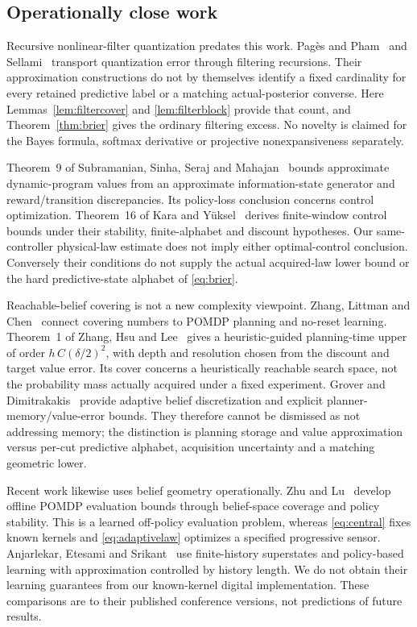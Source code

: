 \subsection{Operationally close work}
Recursive nonlinear-filter quantization predates this work. Pag\`es and Pham~\cite{pages} and Sellami~\cite{sellami} transport quantization error through filtering recursions. Their approximation constructions do not by themselves identify a fixed cardinality for every retained predictive label or a matching actual-posterior converse. Here Lemmas~\ref{lem:filtercover} and \ref{lem:filterblock} provide that count, and Theorem~\ref{thm:brier} gives the ordinary filtering excess. No novelty is claimed for the Bayes formula, softmax derivative or projective nonexpansiveness separately.

Theorem~9 of Subramanian, Sinha, Seraj and Mahajan~\cite{ais} bounds approximate dynamic-program values from an approximate information-state generator and reward/transition discrepancies. Its policy-loss conclusion concerns control optimization. Theorem~16 of Kara and Y\"uksel~\cite{kara} derives finite-window control bounds under their stability, finite-alphabet and discount hypotheses. Our same-controller physical-law estimate does not imply either optimal-control conclusion. Conversely their conditions do not supply the actual acquired-law lower bound or the hard predictive-state alphabet of \eqref{eq:brier}.

Reachable-belief covering is not a new complexity viewpoint. Zhang, Littman and Chen~\cite{zhang2012} connect covering numbers to POMDP planning and no-reset learning. Theorem~1 of Zhang, Hsu and Lee~\cite{zhang2014} gives a heuristic-guided planning-time upper of order $h\,C(\delta/2)^2$, with depth and resolution chosen from the discount and target value error. Its cover concerns a heuristically reachable search space, not the probability mass actually acquired under a fixed experiment. Grover and Dimitrakakis~\cite{grover} provide adaptive belief discretization and explicit planner-memory/value-error bounds. They therefore cannot be dismissed as not addressing memory; the distinction is planning storage and value approximation versus per-cut predictive alphabet, acquisition uncertainty and a matching geometric lower.

Recent work likewise uses belief geometry operationally. Zhu and Lu~\cite{zhulu} develop offline POMDP evaluation bounds through belief-space coverage and policy stability. This is a learned off-policy evaluation problem, whereas \eqref{eq:central} fixes known kernels and \eqref{eq:adaptivelaw} optimizes a specified progressive sensor. Anjarlekar, Etesami and Srikant~\cite{anjarlekar} use finite-history superstates and policy-based learning with approximation controlled by history length. We do not obtain their learning guarantees from our known-kernel digital implementation. These comparisons are to their published conference versions, not predictions of future results.

